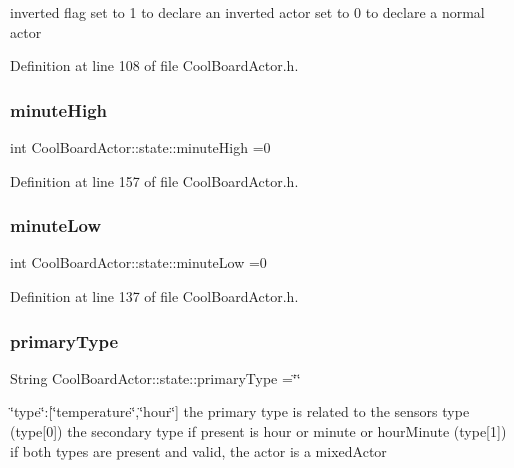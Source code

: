inverted flag set to 1 to declare an inverted actor set to 0 to declare a normal actor 

Definition at line 108 of file Cool\+Board\+Actor.\+h.

\mbox{\label{struct_cool_board_actor_1_1state_a4bff3d61ead74adb60be224764b93006}} 
\subsubsection{\texorpdfstring{minute\+High}{minuteHigh}}
{\footnotesize\ttfamily int Cool\+Board\+Actor\+::state\+::minute\+High =0}



Definition at line 157 of file Cool\+Board\+Actor.\+h.

\mbox{\label{struct_cool_board_actor_1_1state_acbcc2902331fd9d757cd475eb403bdd9}} 
\subsubsection{\texorpdfstring{minute\+Low}{minuteLow}}
{\footnotesize\ttfamily int Cool\+Board\+Actor\+::state\+::minute\+Low =0}



Definition at line 137 of file Cool\+Board\+Actor.\+h.

\mbox{\label{struct_cool_board_actor_1_1state_a8a0b318fd2814cf67fe74ee8164df55e}} 
\subsubsection{\texorpdfstring{primary\+Type}{primaryType}}
{\footnotesize\ttfamily String Cool\+Board\+Actor\+::state\+::primary\+Type =\char`\"{}\char`\"{}}

\char`\"{}type\char`\"{}\+:\mbox{[}\char`\"{}temperature\char`\"{},\char`\"{}hour\char`\"{}\mbox{]} the primary type is related to the sensor\textquotesingle{}s type (type\mbox{[}0\mbox{]}) the secondary type if present is hour or minute or hour\+Minute (type\mbox{[}1\mbox{]}) if both types are present and valid, the actor is a mixed\+Actor 


